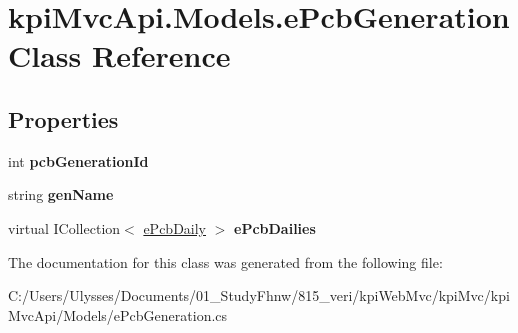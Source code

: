 \hypertarget{classkpi_mvc_api_1_1_models_1_1e_pcb_generation}{}\section{kpi\+Mvc\+Api.\+Models.\+e\+Pcb\+Generation Class Reference}
\label{classkpi_mvc_api_1_1_models_1_1e_pcb_generation}
\subsection*{Properties}
\begin{DoxyCompactItemize}
\item 
\mbox{\label{classkpi_mvc_api_1_1_models_1_1e_pcb_generation_a677b057553557aba85b0f6fa08955d88}} 
int {\bfseries pcb\+Generation\+Id}
\item 
\mbox{\label{classkpi_mvc_api_1_1_models_1_1e_pcb_generation_ab0fa6a2e3a0974273c10dd299510457f}} 
string {\bfseries gen\+Name}
\item 
\mbox{\label{classkpi_mvc_api_1_1_models_1_1e_pcb_generation_a5724d85eb880f55d62f2f62297a5c5b0}} 
virtual I\+Collection$<$ \hyperlink{classkpi_mvc_api_1_1_models_1_1e_pcb_daily}{e\+Pcb\+Daily} $>$ {\bfseries e\+Pcb\+Dailies}
\end{DoxyCompactItemize}


The documentation for this class was generated from the following file\+:\begin{DoxyCompactItemize}
\item 
C\+:/\+Users/\+Ulysses/\+Documents/01\+\_\+\+Study\+Fhnw/815\+\_\+veri/kpi\+Web\+Mvc/kpi\+Mvc/kpi\+Mvc\+Api/\+Models/e\+Pcb\+Generation.\+cs\end{DoxyCompactItemize}
